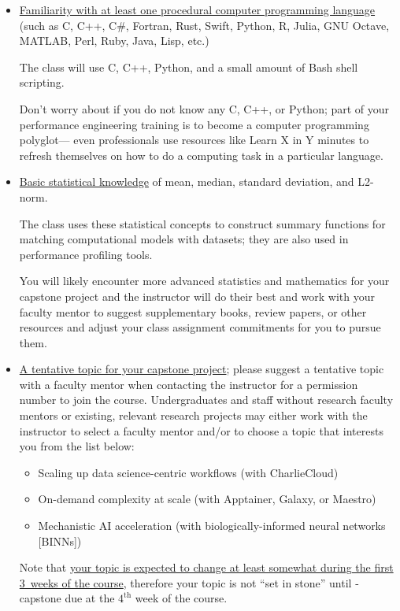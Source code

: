 \documentclass[12pt]{article}
\begin{document}
\begin{itemize}
\item \ul{Familiarity with at least one %
  procedural computer programming language} %
  (such as C, C++, C\#, Fortran, Rust, Swift, %
  Python, R, Julia, GNU Octave, MATLAB, %
  Perl, Ruby, Java, Lisp, etc.)

  The class will use C, C++, Python, and %
  a small amount of Bash shell scripting.

  Don't worry about if you do not know any C, C++, or Python; %
  part of your performance engineering training %
  is to become a computer programming polyglot---%
  even professionals use resources like Learn X in Y minutes %
  to refresh themselves on how to do a computing task in a particular language.
\item \ul{Basic statistical knowledge} %
  of mean, median, standard deviation, and L2-norm.

  The class uses these statistical concepts to construct %
  summary functions for matching computational models with datasets; %
  they are also used in performance profiling tools.

  You will likely encounter more advanced statistics and mathematics %
  for your capstone project %
  and the instructor will do their best and work with your faculty mentor %
  to suggest supplementary books, review papers, or other resources %
  and adjust your class assignment commitments for you to pursue them.
\item \ul{A tentative topic for your capstone project}; %
  please suggest a tentative topic with a faculty mentor when %
  contacting the instructor for a permission number to join the course.
  Undergraduates and staff without research faculty mentors %
  or existing, relevant research projects %
  may either work with the instructor to select a faculty mentor %
  and/or to choose a topic that interests you from the list below:
  \begin{itemize}
  \item Scaling up data science-centric workflows (with CharlieCloud)
  \item On-demand complexity at scale (with Apptainer, Galaxy, or Maestro)
  \item Mechanistic AI acceleration %
    (with biologically-informed neural networks [BINNs])
  \end{itemize}
  Note that %
  \ul{your topic is expected to change at least somewhat %
  during the first 3~weeks of the course}, %
  therefore your topic is not ``set in stone'' until -capstone %
  due at the $4^{\mathrm{th}}$ week of the course.
\end{itemize}
\end{document}
